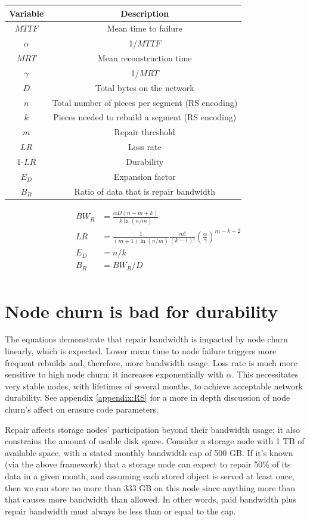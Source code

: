\documentclass[11pt,fleqn,openany]{book}
\begin{document}
\begin{center}
\begin{tabular}{| c | c |}\hline
Variable & Description\\\hline
$MTTF$ & Mean time to failure \\
$\alpha$ & 1/$MTTF$\\
$MRT$ & Mean reconstruction time \\
$\gamma$ & 1/$MRT$\\
$D$&Total bytes on the network\\
$n$ & Total number of pieces per segment (RS encoding)\\
$k$ & Pieces needed to rebuild a segment (RS encoding)\\
$m$ & Repair threshold\\
$LR$ & Loss rate\\
1-$LR$ & Durability\\
$E_D$ & Expansion factor\\
$B_R$ & Ratio of data that is repair bandwidth\\
\hline
\end{tabular}
\end{center}

\begin{align*}
&&BW_R&=\frac{\alpha D(n-m+k)}{k\ln(n/m)}&\\
&&LR&=\frac{1}{(m+1)\ln(n/m)}\frac{m!}{(k-1)!}\left(\frac{\alpha}{\gamma}\right)^{m-k+2}&\\
&&E_D&=n/k&\\
&&B_R&=BW_R/D&\\
\end{align*}

\section{Node churn is bad for durability}\label{appendix:bandwidth-space-limits}

The equations demonstrate that repair bandwidth is impacted by node churn
linearly, which is expected.
Lower mean time to node failure triggers more frequent rebuilds and,
therefore, more bandwidth usage.
Loss rate is much more sensitive to high node churn; it increases
exponentially with $\alpha$.
This necessitates very stable nodes, with lifetimes of several months, to
achieve acceptable network durability.
See appendix \ref{appendix:RS} for a more in depth discussion of node churn's
affect on erasure code parameters.

Repair affects storage nodes' participation beyond their bandwidth usage; it
also constrains the amount of usable disk space.
Consider a storage node with 1 TB of available space, with a stated monthly
bandwidth cap of 500 GB.
If it's known (via the above framework) that a storage node can expect to
repair 50\% of its data in a given month, and assuming each stored object
is served at least once, then we can store no more than 333 GB on this node
since anything more than that causes more bandwidth than allowed.
In other words, paid bandwidth plus repair bandwidth must always be less than
or equal to the cap.
\end{document}
